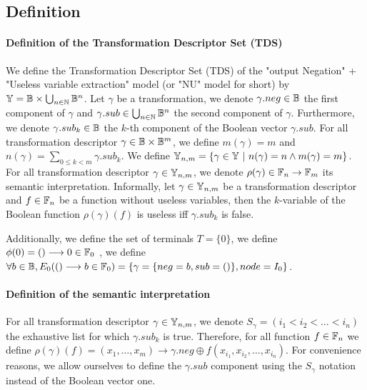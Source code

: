 \documentclass[a4paper,10pt]{article}
\begin{document}
\subsection{Definition}

\paragraph{Definition of the Transformation Descriptor Set (TDS)}

We define the Transformation Descriptor Set (TDS) of the "output Negation" + "Useless variable extraction" model (or "NU" model for short) by $\mathbb{Y} = \mathbb{B} \times \bigcup_{n\in\mathbb{N}} \mathbb{B}^n$.
Let $\gamma$ be a transformation, we denote $\gamma.neg \in \mathbb{B}$ the first component of $\gamma$ and $\gamma.sub \in \bigcup_{n\in\mathbb{N}} \mathbb{B}^n$ the second component of $\gamma$.
Furthermore, we denote $\gamma.sub_k \in\mathbb{B}$ the $k$-th component of the Boolean vector $\gamma.sub$.
For all transformation descriptor $\gamma \in \mathbb{B} \times \mathbb{B}^m$, we define $m(\gamma) = m$ and $n(\gamma) = \sum_{0\leq k < m} \gamma.sub_k$.
We define $\mathbb{Y}_{n, m} = \{\gamma\in\mathbb{Y}~|~n(\gamma) = n \land m(\gamma) = m\}$.
For all transformation descriptor $\gamma\in\mathbb{Y}_{n, m}$, we denote $\rho(\gamma) \in \mathbb{F}_n \rightarrow \mathbb{F}_m$ its semantic interpretation.
Informally, let $\gamma\in\mathbb{Y}_{n, m}$ be a transformation descriptor and $f\in\mathbb{F}_n$ be a function without useless variables, then the $k$-variable of the Boolean function $\rho(\gamma)(f)$ is useless iff $\gamma.sub_k$ is false.

Additionally, we define the set of terminals $T=\{0\}$, we define $\phi(0)=()\longrightarrow{}0\in\mathbb{F}_0$ , we define $\forall b\in\mathbb{B}, E_0(()\longrightarrow b\in\mathbb{F}_0) = \{\gamma = \{neg = b, sub = ()\}, node = I_0\}$.

\paragraph{Definition of the semantic interpretation}

For all transformation descriptor $\gamma\in\mathbb{Y}_{n, m}$, we denote $S_\gamma = \left(i_1 < i_2 < \dots < i_n\right)$ the exhaustive list for which $\gamma.sub_k$ is true.
Therefore, for all function $f\in\mathbb{F}_n$ we define $\rho(\gamma)(f) = (x_1, \dots, x_m) \longrightarrow \gamma.neg \oplus f(x_{i_1}, x_{i_2}, \dots, x_{i_n})$.
For convenience reasons, we allow ourselves to define the $\gamma.sub$ component using the $S_\gamma$ notation instead of the Boolean vector one.
\end{document}

